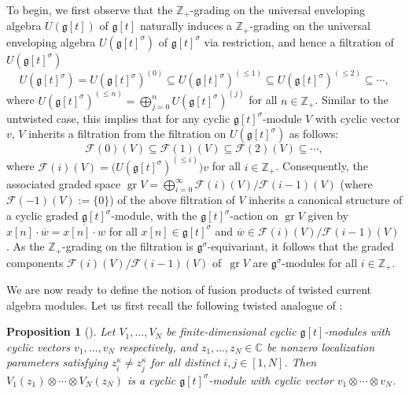 \documentclass[10pt,a4paper]{amsart}
\numberwithin{equation}{section}
\newtheorem{Proposition}[Theorem]{Proposition}
 { \theoremstyle{definition}
\newtheorem{Definition}[Theorem]{Definition}
\newtheorem{Note}[Theorem]{Note}
\newtheorem{Example}[Theorem]{Example}
\newtheorem{Remark}[Theorem]{Remark} }
\DeclareMathOperator{\gr}{gr}
\begin{document}
To begin, we first observe that the $\mathbb{Z}_+$-grading on the universal enveloping algebra $U(\mathfrak{g}[t])$ of $\mathfrak{g}[t]$ naturally induces a $\mathbb{Z}_+$-grading on the universal enveloping algebra $U(\mathfrak{g}[t]^{\sigma})$ of $\mathfrak{g}[t]^{\sigma}$ via restriction, and hence a filtration of $U(\mathfrak{g}[t]^{\sigma})$
\begin{equation*}
U(\mathfrak{g}[t]^{\sigma})= U(\mathfrak{g}[t]^{\sigma})^{(0)}\subseteq U(\mathfrak{g}[t]^{\sigma})^{(\leq 1)}\subseteq U(\mathfrak{g}[t]^{\sigma})^{(\leq 2)}\subseteq\cdots,
\end{equation*}
where $U(\mathfrak{g}[t]^{\sigma})^{(\leq n)}=\bigoplus_{j=0}^n U(\mathfrak{g}[t]^{\sigma})^{(j)}$ for all $n\in\mathbb{Z}_+$. Similar to the untwisted case, this implies that for any cyclic $\mathfrak{g}[t]^{\sigma}$-module $V$ with cyclic vector $v$, $V$ inherits a filtration from the filtration on $U(\mathfrak{g}[t]^{\sigma})$ as follows:
\[
\mathcal{F}(0)(V)\subseteq\mathcal{F}(1)(V)\subseteq\mathcal{F}(2)(V)\subseteq\cdots,
\]
where $\mathcal{F}(i)(V)=\bigl(U(\mathfrak{g}[t]^{\sigma})^{(\leq i)}\bigr)v$ for all $i\in\mathbb{Z}_+$. Consequently, the associated graded space $\gr V=\bigoplus_{i=0}^{\infty}\mathcal{F}(i)(V)/\mathcal{F}(i-1)(V)$ (where $\mathcal{F}(-1)(V):=\{0\}$) of the above filtration of $V$ inherits a canonical structure of a cyclic graded $\mathfrak{g}[t]^{\sigma}$-module, with the $\mathfrak{g}[t]^{\sigma}$-action on $\gr V$ given by~${x[n]\cdot\overline{w}=\overline{x[n]\cdot w}}$
for all $x[n]\in\mathfrak{g}[t]^{\sigma}$ and $\overline{w}\in \mathcal{F}(i)(V)/\mathcal{F}(i-1)(V)$. As the $\mathbb{Z}_+$-grading on the filtration is $\mathfrak{g}^{\sigma}$-equivariant, it follows that the graded components $\mathcal{F}(i)(V)/\mathcal{F}(i-1)(V)$ of~$\gr V$ are $\mathfrak{g}^{\sigma}$-modules for all $i\in\mathbb{Z}_+$.

We are now ready to define the notion of fusion products of twisted current algebra modules. Let us first recall the following twisted analogue of \cite[Proposition 1.4]{FL99}:

\begin{Proposition}[{\cite[Proposition 6.3]{KV16}}]\label{2.2}
Let $V_1,\dots,V_N$ be finite-dimensional cyclic $\mathfrak{g}[t]$-modules with cyclic vectors $v_1,\dots,v_N$ respectively, and $z_1,\dots, z_N\in\mathbb{C}$ be nonzero localization parameters satisfying $z_i^{\kappa}\neq z_j^{\kappa}$ for all distinct $i,j\in[1,N]$. Then $V_1(z_1)\otimes\cdots\otimes V_N(z_N)$ is a cyclic $\mathfrak{g}[t]^{\sigma}$-module with cyclic vector $v_1\otimes\cdots\otimes v_N$.
\end{Proposition}
\end{document}
